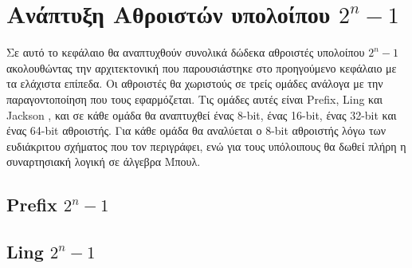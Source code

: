 \section{Ανάπτυξη Αθροιστών υπολοίπου $2^n-1$ }

Σε αυτό το κεφάλαιο θα αναπτυχθούν συνολικά δώδεκα αθροιστές υπολοίπου $2^n-1$
ακολουθώντας την αρχιτεκτονική που παρουσιάστηκε στο προηγούμενο κεφάλαιο 
με τα ελάχιστα επίπεδα. Οι αθροιστές θα χωριστούς σε τρείς ομάδες ανάλογα με την 
παραγοντοποίηση που τους εφαρμόζεται. Τις ομάδες αυτές είναι Prefix, Ling και Jackson ,
και σε κάθε ομάδα θα αναπτυχθεί ένας 8-bit, ένας 16-bit, ένας 32-bit και ένας 64-bit 
αθροιστής. Για κάθε ομάδα θα αναλύεται ο 8-bit αθροιστής λόγω των ευδιάκριτου 
σχήματος που τον περιγράφει, ενώ για τους υπόλοιπους θα δωθεί πλήρη η συναρτησιακή 
λογική σε άλγεβρα Μπουλ.

\subsection{Prefix $2^n-1$}


\subsection{Ling $2^n-1$}









